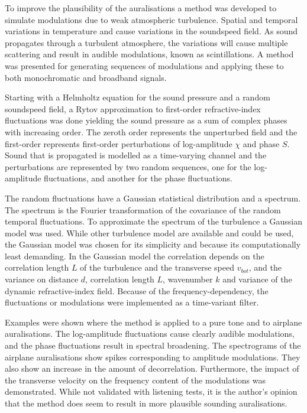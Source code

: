 To improve the plausibility of the auralisations
a method was developed to simulate modulations due to weak atmospheric
turbulence. Spatial and temporal variations in temperature and cause variations
in the soundspeed field. As sound propagates through a turbulent atmosphere, the
variations will cause multiple scattering and result in audible modulations,
known as scintillations. A method was presented for generating sequences of
modulations and applying these to both monochromatic and broadband signals.

Starting with a Helmholtz equation for the sound pressure and a random
soundspeed field, a Rytov approximation to first-order refractive-index
fluctuations was done yielding the sound pressure as a sum of complex phases
with increasing order. The zeroth order represents the unperturbed field and the
first-order represents first-order perturbations of log-amplitude $\chi$ and
phase $S$. Sound that is propagated is modelled as a time-varying channel and
the perturbations are represented by two random sequences, one for the
log-amplitude fluctuations, and another for the phase fluctuations.

The random fluctuations have a Gaussian statistical distribution and a spectrum.
The spectrum is the Fourier transformation of the covariance of the random
temporal fluctuations. To approximate the spectrum of the turbulence a Gaussian
model was used. While other turbulence model are available and could be used,
the Gaussian model was chosen for its simplicity and because its computationally
least demanding. In the Gaussian model the correlation depends on the
correlation length $L$ of the turbulence and the transverse speed $v_{bot}$, and
the variance on distance $d$, correlation length $L$, wavenumber $k$ and
variance of the dynamic refractive-index field. Because of the
frequency-dependency, the fluctuations or modulations were implemented as a
time-variant filter.

Examples were shown where the method is applied to a pure tone and to airplane
auralisations. The log-amplitude fluctuations cause clearly audible modulations,
and the phase fluctuations result in spectral broadening. The spectrograms of
the airplane auralisations show spikes corresponding to amplitude modulations.
They also show an increase in the amount of decorrelation. Furthermore, the
impact of the transverse velocity on the frequency content of the modulations
was demonstrated. While not validated with listening tests, it is the author's
opinion that the method does seem to result in more plausible sounding
auralisations.

